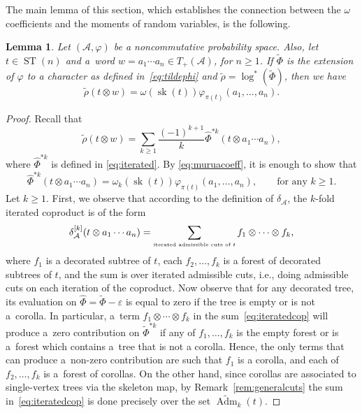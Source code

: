 \documentclass[pdftex]{sigma}%
\numberwithin{equation}{section}
\newtheorem{Lemma}[Theorem]{Lemma}
\newcommand{\A}{\mathcal{A}}
\newcommand{\ST}{\operatorname{ST}}
\newcommand{\sk}{\operatorname{sk}}
\newcommand{\AdmT}{\widetilde{\operatorname{Adm}}}
\begin{document}
The main lemma of this section, which establishes the connection between the $\omega$ coefficients and the moments of random variables, is the following.

\begin{Lemma}
\label{lemma:main}
Let $(\A,\varphi)$ be a noncommutative probability space. Also, let $t \in \ST(n)$ and a~word $w=a_1\cdots a_n\in T_+(\A)$, for $n\geq1$. If $\tilde{\Phi}$ is the extension of $\varphi$ to a character as defined in~\eqref{eq:tildephi} and $\tilde\rho = \log^*(\tilde{\Phi})$, then we have
\begin{equation} \label{eq:tilderho10}
 \tilde\rho(t\otimes w) = \omega(\sk(t)) \varphi_{\pi(t)}(a_1,\dots,a_n).
\end{equation}
\end{Lemma}

\begin{proof}
Recall that
\[
	\tilde\rho(t\otimes w) = \sum_{k\geq 1} \frac{(-1)^{k+1}}{k} \hat\Phi^{*k} (t\otimes a_1\cdots a_n),
\]
where $\hat\Phi^{*k}$ is defined in \eqref{eq:iterated}. By \eqref{eq:muruacoeff}, it is enough to show that
\begin{equation}\label{eq:enough}
	\hat\Phi^{*k} (t\otimes a_1\cdots a_n) = \omega_k(\sk(t)) \varphi_{\pi(t)}(a_1,\dots,a_n),\qquad\mbox{for any }k\geq1.
\end{equation}
Let $k\geq 1$. First, we observe that according to the definition of $\delta_\A$, the $k$-fold iterated coproduct is of the form
\begin{equation}\label{eq:iteratedcop}
	\delta_\A^{[k]}(t\otimes a_1\cdots a_n) = \sum_{\mbox{\tiny{iterated admissible cuts of $t$}}}
	f_1\otimes\cdots \otimes f_k,
\end{equation}
where $f_1$ is a decorated subtree of $t$, each $f_2,\dots,f_k$ is a forest of decorated subtrees of $t$, and the sum is over iterated admissible cuts, i.e., doing admissible cuts on each iteration of the coproduct. Now observe that for any decorated tree, its evaluation on $\hat\Phi = \tilde\Phi - \varepsilon$ is equal to zero if the tree is empty or is not a~corolla. In particular, a~term $f_1\otimes\cdots \otimes f_k$ in the sum~\eqref{eq:iteratedcop} will produce a~zero contribution on $\tilde\Phi^{*k}$ if any of $f_1,\dots,f_k$ is the empty forest or is a~forest which contains a~tree that is not a corolla. Hence, the only terms that can produce a~non-zero contribution are such that $f_1$ is a corolla, and each of $f_2,\dots,f_k$ is a~forest of corollas. On the other hand, since corollas are associated to single-vertex trees via the skeleton map, by Remark~\ref{rem:generalcuts} the sum in~\eqref{eq:iteratedcop} is done precisely over the set $\AdmT_k(t)$.


\end{proof}
\end{document}
